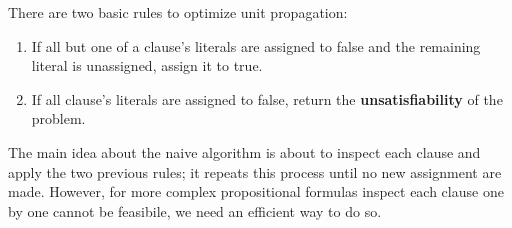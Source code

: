 There are two basic rules to optimize unit propagation:
\begin{enumerate}
    \item If all but one of a clause's literals are assigned to false and the remaining literal is unassigned, assign it to true.
    \item If all clause's literals are assigned to false, return the \textbf{unsatisfiability} of the problem.
\end{enumerate}
The main idea about the naive algorithm is about to inspect each clause and apply the two previous rules; it repeats this process until no new assignment are
made. However, for more complex propositional formulas inspect each clause one by one cannot be feasibile, we need an efficient way to do so.